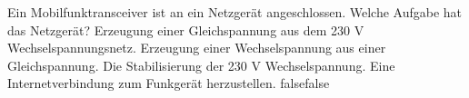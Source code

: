     {Ein Mobilfunktransceiver ist an ein Netzgerät angeschlossen. Welche Aufgabe hat das Netzgerät?}
    {Erzeugung einer Gleichspannung aus dem 230 V Wechselspannungsnetz.}
    {Erzeugung einer Wechselspannung aus einer Gleichspannung.}
    {Die Stabilisierung der 230 V Wechselspannung.}
    {Eine Internetverbindung zum Funkgerät herzustellen.}
    {false}{false}